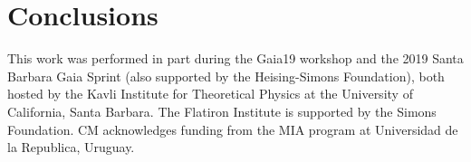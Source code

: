 \documentclass[twocolumn]{aastex63}
\begin{document}
\section{Conclusions} \label{sec:conclusions}


\acknowledgments
This work was performed in part during the Gaia19 workshop and the 2019 Santa Barbara Gaia Sprint (also supported by the Heising-Simons Foundation), both hosted by the Kavli Institute for Theoretical Physics at the University of California, Santa Barbara. The Flatiron Institute is supported by the Simons Foundation. CM acknowledges funding from the MIA program at Universidad de la Republica, Uruguay.





\end{document}

